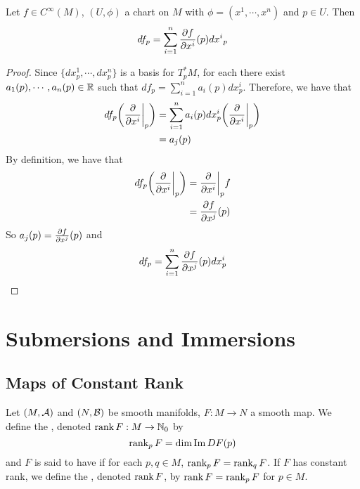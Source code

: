\documentclass{book}
\begin{document}
	\begin{ex}
		Let $f \in C^{\infty}(M)$, $(U, \phi)$ a chart on $M$ with $\phi = (x^1, \cdots, x^n)$ and $p \in U$. Then $$df_p = \sum_{i=1}^n \frac{\partial f}{\partial x^i}(p) {dx^i}_p$$
	\end{ex}

	\begin{proof}
		 Since $\{dx^1_p, \cdots, dx^n_p\}$ is a basis for $T^*_pM$, for each there exist $a_1(p), \cdots, a_n(p) \in \mathbb{R}$ such that $df_p = \sum\limits_{i=1}^n a_i(p)dx^i_p$. Therefore, we have that 
		\begin{align*}
			df_p \bigg(\frac{\partial}{\partial x^i} \bigg|_p \bigg) 
			&= \sum\limits_{i=1}^n a_i(p)dx^i_p \bigg(\frac{\partial}{\partial x^i} \bigg|_p \bigg)  \\
			&=  a_j(p)
		\end{align*}
		By definition, we have that 
		\begin{align*}
			df_p\bigg(\frac{\partial}{\partial x^i} \bigg|_p \bigg) 
			&= \frac{\partial}{\partial x^i} \bigg|_p f \\ 
			&= \frac{\partial f}{\partial x^j}(p)\\
		\end{align*}
		So $a_j(p) = \frac{\partial f}{\partial x^j} (p)$ and $$df_p = \sum\limits_{i=1}^n \frac{\partial f}{\partial x^j} (p)dx^i_p$$
	\end{proof}
		
	
	
	
	
	
	
	
	
	
	
	
	
	
	
	
	
	
	
	\newpage
	\chapter{Submersions and Immersions}
	
	\section{Maps of Constant Rank}
	
	\begin{defn}
		Let $(M, \mathcal{A})$ and $(N, \mathcal{B})$ be smooth manifolds, $F: M \rightarrow N$ a smooth map. We define the , denoted $\operatorname{\text{rank}} F: M \rightarrow \mathbb{N}_0$ by 
		$$\operatorname{\text{rank}}_p F = \dim \text{Im} \, D F(p)$$
		and $F$ is said to have   if for each $p, q \in M$, $\operatorname{\text{rank}}_p F = \operatorname{\text{rank}}_q F$. If $F$ has constant rank, we define the , denoted $\operatorname{\text{rank}} F$, by $\operatorname{\text{rank}} F = \operatorname{\text{rank}}_p F$ for $p \in M$.
	\end{defn}
\end{document}
